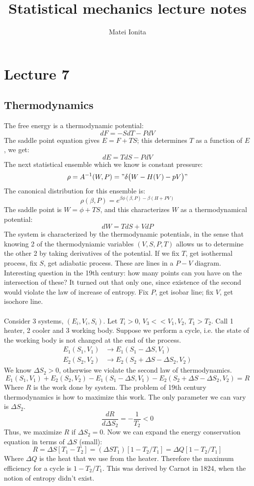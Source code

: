 \documentclass[12 pt]{article}
\title{Statistical mechanics lecture notes}
\author{Matei Ionita}
\begin{document}
  \maketitle

\section*{Lecture 7}
\subsection*{Thermodynamics}
The free energy is a thermodynamic potential:
\[     dF = -SdT - P dV     \]
The saddle point equation gives $E = F + TS$; this determines $T$ as a function of $E$, we get:
\[     dE = TdS - PdV       \]
The next statistical ensemble which we know is constant pressure:
\[    \rho = A^{-1}(W,P) = "\delta\big(W - H(V) - pV\big)"     \]
The canonical distribution for this ensemble is:
\[      \rho(\beta, P) = e^{\beta \phi(\beta, P) - \beta(H+PV)}    \]
The saddle point is $W = \phi + TS$, and this characterizes $W$ as a thermodynamical potential:
\[      dW = TdS + VdP        \]
The system is characterized by the thermodynamic potentials, in the sense that knowing 2 of the thermodyniamic variables $(V,S,P,T)$ allows us to determine the other 2 by taking derivatives of the potential. If we fix $T$, get isothermal process, fix $S$, get adiabatic process. These are lines in a $P-V$ diagram. Interesting question in the 19th century: how many points can you have on the intersection of these? It turned out that only one, since existence of the second would violate the law of increase of entropy. Fix $P$, get isobar line; fix $V$, get isochore line.
\\
\\
Consider 3 systems, $(E_i, V_i, S_i)$. Let $T_i >0$, $V_3<<V_1, V_2$, $T_1 > T_2$. Call 1 heater, 2 cooler and 3 working body. Suppose we perform a cycle, i.e. the state of the working body is not changed at the end of the process.
\begin{align*}      E_1(S_1, V_1) &\to E_1(S_1 - \Delta S , V_1)      \\
E_2 (S_2, V_2) &\to E_2(S_2 + \Delta S - \Delta S_2 , V_2)
\end{align*}
We know $\Delta S_2>0$, otherwise we violate the second law of thermodynamics.
\[        E_1(S_1, V_1) + E_2(S_2, V_2) - E_1(S_1 - \Delta S , V_1) - E_2(S_2 + \Delta S - \Delta S_2 , V_2) = R         \]
Where $R$ is the work done by system. The problem of 19th century thermodynamics is how to maximize this work. The only parameter we can vary is $\Delta S_2$.
\[     \frac{dR}{d\Delta S_2} = - \frac{1}{T_2} < 0     \]
Thus, we maximize $R$ if $\Delta S_2 = 0$. Now we can expand the energy conservation equation in terms of $\Delta S$ (small):
\[        R = \Delta S  [  T_1 - T_2  ]   = (\Delta S T_1) [ 1 - T_2/T_1]  = \Delta Q [1 - T_2/T_1]  \]
Where $\Delta Q$ is the heat that we use from the heater. Therefore the maximum efficiency for a cycle is $1 - T_2/T_1$. This was derived by Carnot in 1824, when the notion of entropy didn't exist.
\end{document}
